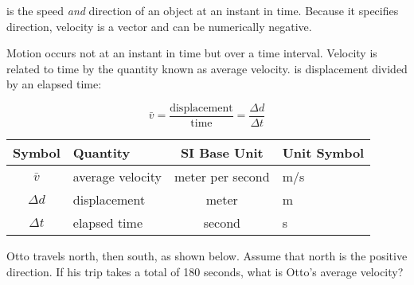 \documentclass{article}
\begin{document}
 is the speed \textit{and} direction of an object at an instant in time. Because it specifies direction, velocity is a vector and can be numerically negative.

\vspace{1em}

Motion occurs not at an instant in time but over a time interval. Velocity is related to time by the quantity known as average velocity.  is displacement divided by an elapsed time:
 
\begin{equation} \label{Elg0tf}
    \bar{v} = 
   \mathrm{\frac{displacement}{time}} = \frac{\Delta{d}}{\Delta{t}}
\end{equation}


\begin{center}
    \begin{tabular}{cl|cl}
    \hline
    \textbf{Symbol} & \textbf{Quantity} & \textbf{SI Base Unit} & \textbf{Unit Symbol}  \\
    \hline\hline
        $\bar{v}$ & average velocity & meter per second & m/s\\
        $\Delta{d}$ & displacement & meter & m\\
        $\Delta t$ & elapsed time & second & s \\
    \hline
    \end{tabular}
\end{center}

\begin{example} \label{vuA8Jc}
Otto travels north, then south, as shown below. Assume that north is the positive direction. If his trip takes a total of 180 seconds, what is Otto's average velocity?
\end{example}

\begin{center}
    \captionsetup{type=figure,margin=1in,font=scriptsize}
    \label{vds9fx}
\end{center}
\end{document}
